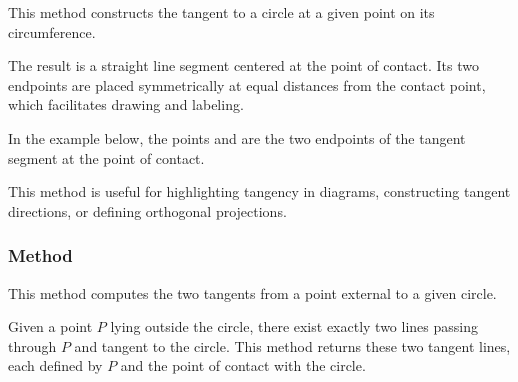 This method constructs the tangent to a circle at a given point on its circumference.

\medskip
\noindent
The result is a straight line segment centered at the point of contact. Its two endpoints are placed symmetrically at equal distances from the contact point, which facilitates drawing and labeling.

\medskip
\noindent
In the example below, the points  and  are the two endpoints of the tangent segment at the point of contact.

\medskip
\noindent
This method is useful for highlighting tangency in diagrams, constructing tangent directions, or defining orthogonal projections.

\vspace{1em}


\begin{minipage}{.5\textwidth}
\end{minipage}
\begin{minipage}{.5\textwidth}
\begin{tkzexample}
\end{tkzexample}
\end{minipage}

\subsubsection{Method }
\label{ssub:method_circle_tangent__from_pt}

This method computes the two tangents from a point external to a given circle.

\medskip
\noindent
Given a point $P$ lying outside the circle, there exist exactly two lines passing through $P$ and tangent to the circle. This method returns these two tangent lines, each defined by $P$ and the point of contact with the circle.

